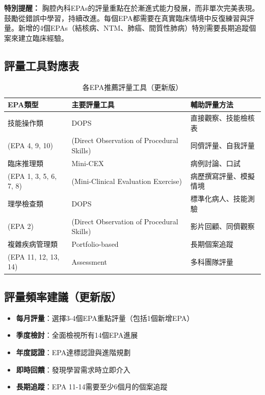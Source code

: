 \documentclass[12pt,a4paper]{article}
\begin{document}
\begin{importantbox}
\textbf{特別提醒：} 胸腔內科EPAs的評量重點在於漸進式能力發展，而非單次完美表現。鼓勵從錯誤中學習，持續改進。每個EPA都需要在真實臨床情境中反復練習與評量。新增的4個EPAs（結核病、NTM、肺癌、間質性肺病）特別需要長期追蹤個案來建立臨床經驗。
\end{importantbox}

\subsection{評量工具對應表}
\begin{table}[h]
    \centering
    \caption{各EPA推薦評量工具（更新版）}
    \begin{tabular}{p{4.5cm} p{4cm} p{5.5cm}}
        \toprule
        \textbf{EPA類型} & \textbf{主要評量工具} & \textbf{輔助評量方法} \\
        \midrule
        技能操作類 & DOPS & 直接觀察、技能檢核表 \\
        (EPA 4, 9, 10) & (Direct Observation of Procedural Skills) & 同儕評量、自我評量 \\
        \midrule
        臨床推理類 & Mini-CEX & 病例討論、口試 \\
        (EPA 1, 3, 5, 6, 7, 8) & (Mini-Clinical Evaluation Exercise) & 病歷撰寫評量、模擬情境 \\
        \midrule
        理學檢查類 & DOPS & 標準化病人、技能測驗 \\
        (EPA 2) & (Direct Observation of Procedural Skills) & 影片回顧、同儕觀察 \\
        \midrule
        \textcolor{emergency_red}{複雜疾病管理類} & \textcolor{emergency_red}{Portfolio-based} & \textcolor{emergency_red}{長期個案追蹤} \\
        \textcolor{emergency_red}{(EPA 11, 12, 13, 14)} & \textcolor{emergency_red}{Assessment} & \textcolor{emergency_red}{多科團隊評量} \\
        \bottomrule
    \end{tabular}
\end{table}

\subsection{評量頻率建議（更新版）}
\begin{itemize}[nosep]
    \item \textbf{每月評量}：選擇3-4個EPA重點評量（包括1個新增EPA）
    \item \textbf{季度檢討}：全面檢視所有14個EPA進展
    \item \textbf{年度認證}：EPA達標認證與進階規劃
    \item \textbf{即時回饋}：發現學習需求時立即介入
    \item \textbf{長期追蹤}：EPA 11-14需要至少6個月的個案追蹤
\end{itemize}
\end{document}
